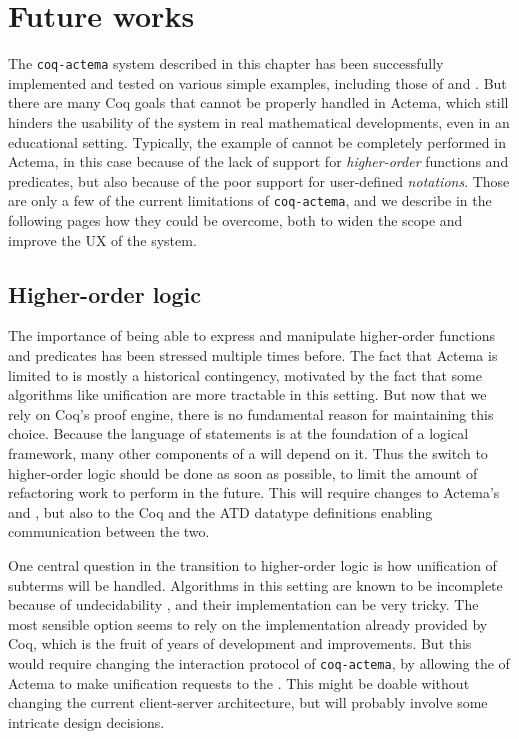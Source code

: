 \section{Future works}

The \texttt{coq-actema} system described in this chapter has been successfully
implemented and tested on various simple examples, including those of
 and . But there are many Coq goals that cannot be
properly handled in Actema, which still hinders the usability of the system in
real mathematical developments, even in an educational setting. Typically, the
example of  cannot be completely performed in Actema, in this case
because of the lack of support for \emph{higher-order} functions and predicates,
but also because of the poor support for user-defined \emph{notations}. Those
are only a few of the current limitations of \texttt{coq-actema}, and we
describe in the following pages how they could be overcome, both to widen the
scope and improve the UX of the system.

\subsection{Higher-order logic}

The importance of being able to express and manipulate higher-order functions
and predicates has been stressed multiple times before. The fact that Actema is
limited to  is mostly a historical contingency, motivated by
the fact that some algorithms like unification are more tractable in this
setting. But now that we rely on Coq's proof engine, there is no fundamental
reason for maintaining this choice. Because the language of statements is at the
foundation of a logical framework, many other components of a 
will depend on it. Thus the switch to higher-order logic should be done as soon
as possible, to limit the amount of refactoring work to perform in the future.
This will require changes to Actema's  and ,
but also to the Coq  and the ATD datatype definitions enabling
communication between the two.

One central question in the transition to higher-order logic is how unification
of subterms will be handled. Algorithms in this setting are known to be
incomplete because of undecidability , and
their implementation can be very tricky. The most sensible option seems to rely
on the implementation already provided by Coq, which is the fruit of years of
development and improvements. But this would require changing the interaction
protocol of \texttt{coq-actema}, by allowing the  of Actema to
make unification requests to the . This might be doable without
changing the current client-server architecture, but will probably involve some
intricate design decisions.

